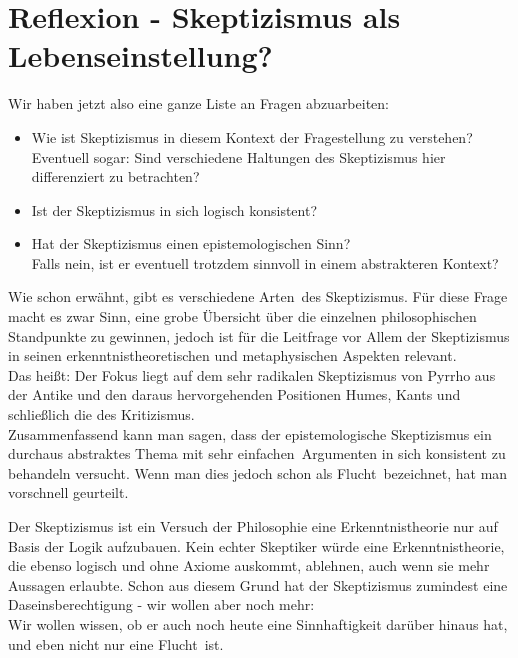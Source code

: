 \documentclass[11pt,a4paper]{article}
\begin{document}
\section{Reflexion - Skeptizismus als Lebenseinstellung?}
Wir haben jetzt also eine ganze Liste an Fragen abzuarbeiten:
\begin{itemize}
\item Wie ist Skeptizismus in diesem Kontext der Fragestellung zu verstehen?\\
Eventuell sogar: Sind verschiedene Haltungen des Skeptizismus hier differenziert zu betrachten?
\item Ist der Skeptizismus in sich logisch konsistent?
\item Hat der Skeptizismus einen epistemologischen Sinn?\\
Falls nein, ist er eventuell trotzdem sinnvoll in einem abstrakteren Kontext? %
\end{itemize}

Wie schon erwähnt, gibt es verschiedene \glqq Arten\grqq\  des Skeptizismus. Für diese Frage macht es zwar Sinn, eine grobe Übersicht über die einzelnen philosophischen Standpunkte zu gewinnen, jedoch ist für die Leitfrage vor Allem der Skeptizismus in seinen erkenntnistheoretischen und metaphysischen Aspekten relevant.\\
Das heißt: Der Fokus liegt auf dem sehr radikalen Skeptizismus von Pyrrho aus der Antike und den daraus hervorgehenden Positionen Humes, Kants und schließlich die des Kritizismus.\\
Zusammenfassend kann man sagen, dass der epistemologische Skeptizismus ein durchaus abstraktes Thema mit sehr \glqq einfachen\grqq\ Argumenten in sich konsistent zu behandeln versucht. Wenn man dies jedoch schon als \glqq Flucht\grqq\ bezeichnet, hat man vorschnell geurteilt.

Der Skeptizismus ist ein Versuch der Philosophie eine Erkenntnistheorie nur auf Basis der Logik aufzubauen. Kein echter Skeptiker würde eine Erkenntnistheorie, die ebenso logisch und ohne Axiome auskommt, ablehnen, auch wenn sie mehr Aussagen erlaubte. Schon aus diesem Grund hat der Skeptizismus zumindest eine Daseinsberechtigung - wir wollen aber noch mehr:\\
Wir wollen wissen, ob er auch noch heute eine Sinnhaftigkeit darüber hinaus hat,  und eben nicht nur eine \glqq Flucht\grqq\ ist.
\end{document}
